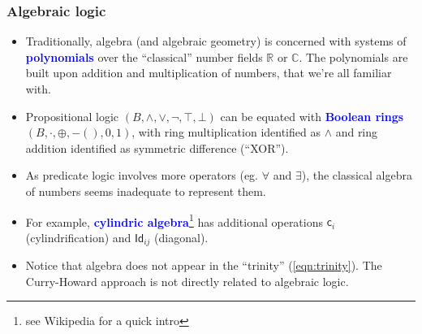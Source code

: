 \documentclass[16pt]{beamer}
\let\oldtextbf\textbf
\renewcommand{\textbf}[1]{\textcolor{blue}{\oldtextbf{#1}}}
\begin{document}
\begin{frame}
\frametitle{Algebraic logic}
\begin{itemize}
	\item Traditionally, algebra (and algebraic geometry) is concerned with systems of \textbf{polynomials} over the ``classical'' number fields $\mathbb{R}$ or $\mathbb{C}$.  The polynomials are built upon addition and multiplication of numbers, that we're all familiar with.
	\item Propositional logic $(B, \wedge, \vee, \neg, \top, \bot)$ can be equated with \textbf{Boolean rings} $(B, \cdot, \oplus, -(), 0, 1)$, with ring multiplication identified as $\wedge$ and ring addition identified as symmetric difference (``XOR'').
	\item As predicate logic involves more operators (eg. $\forall$ and $\exists$), the classical algebra of numbers seems inadequate to represent them.
	\item For example, \textbf{cylindric algebra}\footnote{see Wikipedia for a quick intro} has additional operations $\mathsf{c}_i$ (cylindrification) and $\mathsf{Id}_{ij}$ (diagonal).
	\item Notice that algebra does not appear in the ``trinity'' (\ref{eqn:trinity}).  The Curry-Howard approach is not directly related to algebraic logic.
\end{itemize}
\end{frame}
\end{document}
